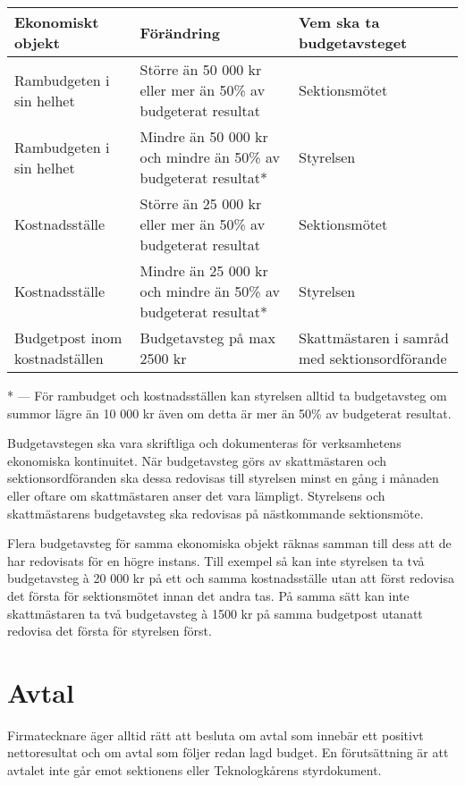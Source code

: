 \documentclass{dsekprotokoll}
\begin{document}
\begin{center}
  \renewcommand{\arraystretch}{1.75}
  \begin{tabular}{p{}|p{}|p{}}
    Ekonomiskt objekt & Förändring & Vem ska ta budgetavsteget \\ \hline
    Rambudgeten i sin helhet & Större än 50 000 kr eller mer än 50\% av
    budgeterat resultat & Sektionsmötet \\
    Rambudgeten i sin helhet & Mindre än 50 000 kr och mindre än 50\% av
    budgeterat resultat* & Styrelsen \\
    Kostnadsställe & Större än 25 000 kr eller mer än 50\% av budgeterat
    resultat & Sektionsmötet \\
    Kostnadsställe & Mindre än 25 000 kr och mindre än 50\% av budgeterat
    resultat* & Styrelsen \\
    Budgetpost inom kostnadställen & Budgetavsteg på max 2500 kr & Skattmästaren
    i samråd med sektionsordförande
  \end{tabular}
  \renewcommand{\arraystretch}{1.0}
\end{center}
* --- För rambudget och kostnadsställen kan styrelsen alltid ta budgetavsteg om summor lägre
än 10 000 kr även om detta är mer än 50\% av budgeterat resultat.

Budgetavstegen ska vara skriftliga och dokumenteras för verksamhetens ekonomiska
kontinuitet. När budgetavsteg görs av skattmästaren och sektionsordföranden
ska dessa redovisas till styrelsen minst en gång i månaden eller oftare om
skattmästaren anser det vara lämpligt.  Styrelsens och skattmästarens
budgetavsteg ska redovisas på nästkommande sektionsmöte.

Flera budgetavsteg för samma ekonomiska objekt räknas samman till dess att de
har redovisats för en högre instans. Till exempel så kan inte styrelsen ta två
budgetavsteg à 20 000 kr på ett och samma kostnadsställe utan att först redovisa
det första för sektionsmötet innan det andra tas.  På samma sätt kan inte
skattmästaren ta två budgetavsteg à 1500 kr på samma budgetpost utanatt redovisa
det första för styrelsen först.

\section{Avtal}
Firmatecknare äger alltid rätt att besluta om avtal som innebär ett positivt nettoresultat och om
avtal som följer redan lagd budget. En förutsättning är att avtalet inte går emot sektionens eller
Teknologkårens styrdokument.
\end{document}
